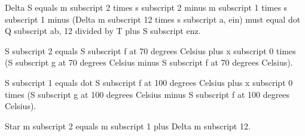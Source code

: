 Delta S equals m subscript 2 times s subscript 2 minus m subscript 1 times s subscript 1 minus (Delta m subscript 12 times s subscript a, ein) must equal dot Q subscript ab, 12 divided by T plus S subscript enz.

S subscript 2 equals S subscript f at 70 degrees Celsius plus x subscript 0 times (S subscript g at 70 degrees Celsius minus S subscript f at 70 degrees Celsius).

S subscript 1 equals dot S subscript f at 100 degrees Celsius plus x subscript 0 times (S subscript g at 100 degrees Celsius minus S subscript f at 100 degrees Celsius).

Star m subscript 2 equals m subscript 1 plus Delta m subscript 12.